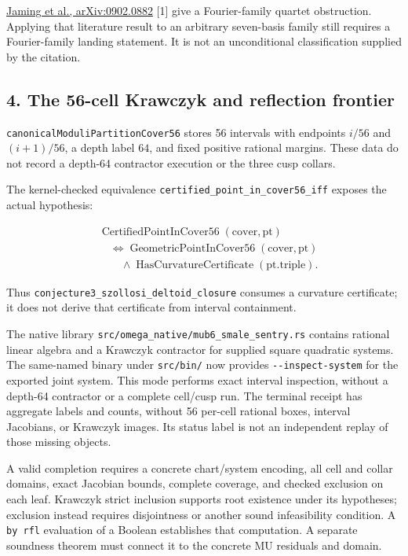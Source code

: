 \documentclass[
]{article}
\begin{document}
\href{https://arxiv.org/abs/0902.0882}{Jaming et al., arXiv:0902.0882}
{[}1{]} give a Fourier-family quartet obstruction. Applying that
literature result to an arbitrary seven-basis family still requires a
Fourier-family landing statement. It is not an unconditional
classification supplied by the citation.

\subsection{4. The 56-cell Krawczyk and reflection
frontier}\label{the-56-cell-krawczyk-and-reflection-frontier}

\nolinkurl{canonicalModuliPartitionCover56} stores 56 intervals with
endpoints \(i/56\) and \((i+1)/56\), a depth label \(64\), and fixed
positive rational margins. These data do not record a depth-64
contractor execution or the three cusp collars.

The kernel-checked equivalence
\nolinkurl{certified_point_in_cover56_iff} exposes the actual
hypothesis:

\[
\begin{aligned}
&\operatorname{CertifiedPointInCover56}(\mathrm{cover},\mathrm{pt})\\
&\quad\Longleftrightarrow
\operatorname{GeometricPointInCover56}(\mathrm{cover},\mathrm{pt})\\
&\qquad\land\operatorname{HasCurvatureCertificate}(\mathrm{pt.triple}).
\end{aligned}
\]

Thus \nolinkurl{conjecture3_szollosi_deltoid_closure} consumes a
curvature certificate; it does not derive that certificate from interval
containment.

The native library \nolinkurl{src/omega_native/mub6_smale_sentry.rs}
contains rational linear algebra and a Krawczyk contractor for supplied
square quadratic systems. The same-named binary under
\nolinkurl{src/bin/} now provides \nolinkurl{--inspect-system} for the
exported joint system. This mode performs exact interval inspection,
without a depth-64 contractor or a complete cell/cusp run. The terminal
receipt has aggregate labels and counts, without 56 per-cell rational
boxes, interval Jacobians, or Krawczyk images. Its status label is not
an independent replay of those missing objects.

A valid completion requires a concrete chart/system encoding, all cell
and collar domains, exact Jacobian bounds, complete coverage, and
checked exclusion on each leaf. Krawczyk strict inclusion supports root
existence under its hypotheses; exclusion instead requires disjointness
or another sound infeasibility condition. A \nolinkurl{by rfl}
evaluation of a Boolean establishes that computation. A separate
soundness theorem must connect it to the concrete MU residuals and
domain.
\end{document}
